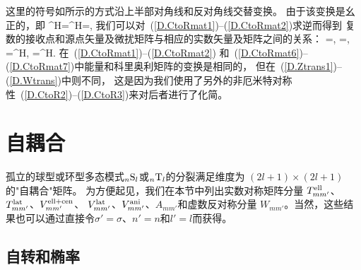 \en
这里的符号如所示的方式沿上半部对角线和反对角线交替变换。
由于该变换是幺正的，即
\eq \label{D.CtoRmat5}
\ssU^{\rm H}\ssU=\ssU\ssU^{\rm H}=\ssI,
\en
我们可以对~(\ref{D.CtoRmat1})--(\ref{D.CtoRmat2})求逆而得到
复数的接收点和源点矢量及微扰矩阵与相应的实数矢量及矩阵之间的关系：
\eq \label{D.CtoRmat6}
\tilde{\ssr}=\ssU\ssr,\qquad
\tilde{\sss}=\ssU\sss,
\en
\eq \label{D.CtoRmat7}
\tilde{\ssM}=\ssU\ssM\ssU^{\rm H},\qquad
\tilde{\ssW}=\ssU\ssW\ssU^{\rm H}.
\en
在~(\ref{D.CtoRmat1})--(\ref{D.CtoRmat2})
和~(\ref{D.CtoRmat6})--(\ref{D.CtoRmat7})中能量和科里奥利矩阵的变换是相同的，
但在~(\ref{D.Ztrans1})--(\ref{D.Wtrans})中则不同，
这是因为我们使用了另外的非厄米特对称性~(\ref{D.CtoR2})--(\ref{D.CtoR3})来对后者进行了化简。
%
%

\section{自耦合}
%
\label{D.sec.self}

孤立的球型或环型多态模式${}_n{\rm S}_l$或${}_n{\rm T}_l$的分裂满足维度为 $(2l+1)\times(2l+1)$的"自耦合"矩阵。
为方便起见，我们在本节中列出实数对称矩阵分量
$T_{mm'}^{\rm ell}$、$T_{mm'}^{\rm lat}$、$V_{mm'}^{\rm ell+cen}$、
$V_{mm'}^{\rm lat}$、$V_{mm'}^{\rm ani}$、$A_{mm'}$和虚数反对称分量
$W_{mm'}$。当然，这些结果也可以通过直接令$\sigma'=\sigma$、$n'=n$和$l'=l$而获得。

\subsection{自转和椭率}
%
%
%
%

